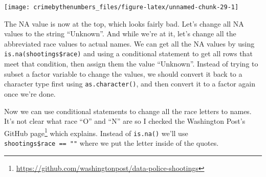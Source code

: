 \documentclass[
]{krantz}
\makeatletter
\newenvironment{Shaded}{\begin{snugshade}}{\end{snugshade}}
\newcommand{\FunctionTok}[1]{\textcolor[rgb]{0,0,0}{#1}}
\newcommand{\NormalTok}[1]{#1}
\newcommand{\OtherTok}[1]{\textcolor[rgb]{0.37,0.37,0.37}{#1}}
\newcommand{\SpecialCharTok}[1]{\textcolor[rgb]{0,0,0}{#1}}
\newcommand{\StringTok}[1]{\textcolor[rgb]{0.5,0.5,0.5}{#1}}
\renewcommand{\href}[2]{#2\footnote{\url{#1}}}
\newenvironment{kframe}{%
\medskip{}
\setlength{\fboxsep}{.8em}
 \def\at@end@of@kframe{}%
 \ifinner\ifhmode%
  \def\at@end@of@kframe{\end{minipage}}%
  \begin{minipage}{\columnwidth}%
 \fi\fi%
 \def\FrameCommand##1{\hskip\@totalleftmargin \hskip-\fboxsep
 \colorbox{shadecolor}{##1}\hskip-\fboxsep
     \hskip-\linewidth \hskip-\@totalleftmargin \hskip\columnwidth}%
 \MakeFramed {\advance\hsize-\width
   \@totalleftmargin\z@ \linewidth\hsize
   \@setminipage}}%
 {\par\unskip\endMakeFramed%
 \at@end@of@kframe}
\renewenvironment{Shaded}{\begin{kframe}}{\end{kframe}}
\makeatother
\begin{document}
\begin{center}\texttt{[image: crimebythenumbers\_files/figure-latex/unnamed-chunk-29-1]} \end{center}

The NA value is now at the top, which looks fairly bad. Let's change all NA values to the string ``Unknown''. And while we're at it, let's change all the abbreviated race values to actual names. We can get all the NA values by using \texttt{is.na(shootings\$race)} and using a conditional statement to get all rows that meet that condition, then assign them the value ``Unknown''. Instead of trying to subset a factor variable to change the values, we should convert it back to a character type first using \texttt{as.character()}, and then convert it to a factor again once we're done.

\begin{Shaded}
\end{Shaded}

Now we can use conditional statements to change all the race letters to names. It's not clear what race ``O'' and ``N'' are so I checked the \href{https://github.com/washingtonpost/data-police-shootings}{Washington Post's GitHub page} which explains. Instead of \texttt{is.na()} we'll use \texttt{shootings\$race\ ==\ ""} where we put the letter inside of the quotes.

\begin{Shaded}
\end{Shaded}
\end{document}
